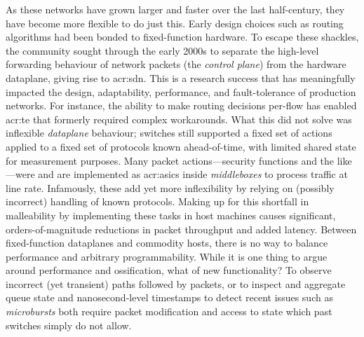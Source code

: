As these networks have grown larger and faster over the last half-century, they have become more flexible to do just this.
Early design choices such as routing algorithms had been bonded to fixed-function hardware.
To escape these shackles, the community sought through the early 2000s to separate the high-level forwarding behaviour of network packets (the \emph{control plane}) from the hardware dataplane, giving rise to \gls{acr:sdn}.
This is a research success that has meaningfully impacted the design, adaptability, performance, and fault-tolerance of production networks.
For instance, the ability to make routing decisions per-flow has enabled \gls{acr:te} that formerly required complex workarounds.
What this did not solve was inflexible \emph{dataplane} behaviour; switches still supported a fixed set of actions applied to a fixed set of protocols known ahead-of-time, with limited shared state for measurement purposes.
Many packet actions---security functions and the like---were and are implemented as \glspl{acr:asic} inside \emph{middleboxes} to process traffic at line rate.
Infamously, these add yet more inflexibility by relying on (possibly incorrect) handling of known protocols.
Making up for this shortfall in malleability by implementing these tasks in host machines causes significant, orders-of-magnitude reductions in packet throughput and added latency.
Between fixed-function dataplanes and commodity hosts, there is no way to balance performance and arbitrary programmability.
While it is one thing to argue around performance and ossification, what of new functionality?
To observe incorrect (yet transient) paths followed by packets, or to inspect and aggregate queue state and nanosecond-level timestamps to detect recent issues such as \emph{microbursts} both require packet modification and access to state which past switches simply do not allow.



